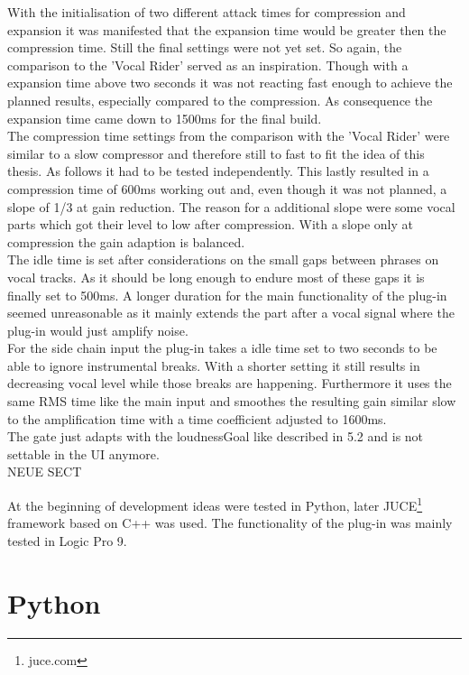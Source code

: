 With the initialisation of two different attack times for compression and expansion it was manifested that the expansion time would be greater then the compression time. Still the final settings were not yet set. So again, the comparison to the 'Vocal Rider' served as an inspiration. Though with a expansion time above two seconds it was not reacting fast enough to achieve the planned results, especially compared to the compression. As consequence the expansion time came down to 1500ms for the final build.\\
The compression time settings from the comparison with the 'Vocal Rider' were similar to a slow compressor and therefore still to fast to fit the idea of this thesis. As follows it had to be tested independently. This lastly resulted in a compression time of 600ms working out and, even though it was not planned, a slope of 1/3 at gain reduction. The reason for a additional slope were some vocal parts which got their level to low after compression. With a slope only at compression the gain adaption is balanced.\\
The idle time is set after considerations on the small gaps between phrases on vocal tracks. As it should be long enough to endure most of these gaps it is finally set to 500ms. A longer duration for the main functionality of the plug-in seemed unreasonable as it mainly extends the part after a vocal signal where the plug-in would just amplify noise.\\
For the side chain input the plug-in takes a idle time set to two seconds to be able to ignore instrumental breaks. With a shorter setting it still results in decreasing vocal level while those breaks are happening. Furthermore it uses the same RMS time like the main input and smoothes the resulting gain similar slow to the amplification time with a time coefficient adjusted to 1600ms.\\
The gate just adapts with the loudnessGoal like described in 5.2 and is not settable in the UI anymore.\\




NEUE SECT


At the beginning of development ideas were tested in Python, later JUCE\footnote{juce.com} framework based on C++ was used. The functionality of the plug-in was mainly tested in Logic Pro 9.\\

\section{Python}

